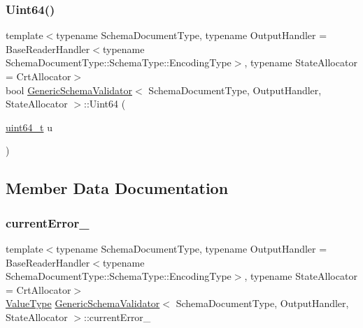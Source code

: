 \mbox{\label{classGenericSchemaValidator_abfc56c58cf0b65318e376fc5f2879292}} 
\subsubsection{\texorpdfstring{Uint64()}{Uint64()}}
{\footnotesize\ttfamily template$<$typename Schema\+Document\+Type, typename Output\+Handler = Base\+Reader\+Handler$<$typename Schema\+Document\+Type\+::\+Schema\+Type\+::\+Encoding\+Type$>$, typename State\+Allocator = Crt\+Allocator$>$ \\
bool \hyperlink{classGenericSchemaValidator}{Generic\+Schema\+Validator}$<$ Schema\+Document\+Type, Output\+Handler, State\+Allocator $>$\+::Uint64 (\begin{DoxyParamCaption}\item[{\hyperlink{stdint_8h_aec6fcb673ff035718c238c8c9d544c47}{uint64\+\_\+t}}]{u }\end{DoxyParamCaption})\hspace{0.3cm}{\ttfamily [inline]}}



\subsection{Member Data Documentation}
\mbox{\label{classGenericSchemaValidator_afa09db405ea6ce3f35d04401c89023f4}} 
\subsubsection{\texorpdfstring{current\+Error\+\_\+}{currentError\_}}
{\footnotesize\ttfamily template$<$typename Schema\+Document\+Type, typename Output\+Handler = Base\+Reader\+Handler$<$typename Schema\+Document\+Type\+::\+Schema\+Type\+::\+Encoding\+Type$>$, typename State\+Allocator = Crt\+Allocator$>$ \\
\hyperlink{classGenericSchemaValidator_a435890a2dddeecb896d4ac76de03ca68}{Value\+Type} \hyperlink{classGenericSchemaValidator}{Generic\+Schema\+Validator}$<$ Schema\+Document\+Type, Output\+Handler, State\+Allocator $>$\+::current\+Error\+\_\+\hspace{0.3cm}{\ttfamily [private]}}

